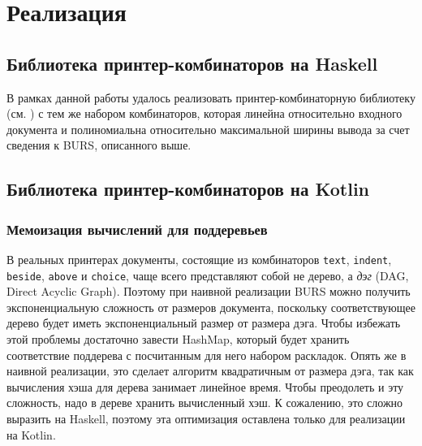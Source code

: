 \section{Реализация}



\subsection{Библиотека принтер-комбинаторов на Haskell}
В рамках данной работы удалось реализовать
принтер-комбинаторную библиотеку (см. \cite{haskellImpl}) с тем же набором комбинаторов,
которая линейна относительно входного документа и полиномиальна
относительно максимальной ширины вывода за счет сведения к BURS, описанного выше.




\subsection{Библиотека принтер-комбинаторов на Kotlin}

\subsubsection{Мемоизация вычислений для поддеревьев}

В реальных принтерах документы, состоящие из комбинаторов
\lstinline[language=Haskell]{text},
\lstinline[language=Haskell]{indent},
\lstinline[language=Haskell]{beside},
\lstinline[language=Haskell]{above} и \lstinline[language=Haskell]{choice}, чаще всего
представляют собой не дерево, а \textit{дэг} (DAG, Direct Acyclic Graph). Поэтому при наивной
реализации BURS можно получить экспоненциальную сложность от размеров документа,
поскольку соответствующее дерево будет иметь экспоненциальный размер от размера дэга.
Чтобы избежать этой проблемы достаточно завести HashMap, который будет хранить соответствие
поддерева с посчитанным для него набором раскладок. Опять же в наивной реализации,
это сделает алгоритм квадратичным от размера дэга, так как вычисления хэша для дерева занимает
линейное время. Чтобы преодолеть и эту сложность, надо в дереве хранить вычисленный хэш.
К сожалению, это сложно выразить на Haskell, поэтому эта оптимизация оставлена только для реализации
на Kotlin.

